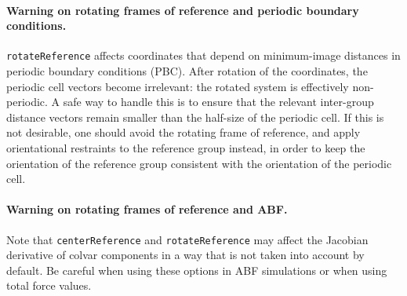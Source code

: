 \paragraph*{Warning on rotating frames of reference and periodic boundary conditions.}
\texttt{rotateReference} affects coordinates that depend on minimum-image distances in periodic boundary conditions (PBC).
After rotation of the coordinates, the periodic cell vectors become irrelevant: the rotated system is effectively non-periodic.
A safe way to handle this is to ensure that the relevant inter-group distance vectors remain smaller than the half-size of the periodic cell.
If this is not desirable, one should avoid the rotating frame of reference, and apply orientational restraints to the reference group instead, in order to keep the orientation of the reference group consistent with the orientation of the periodic cell.

\paragraph*{Warning on rotating frames of reference and ABF.}
Note that \texttt{centerReference} and \texttt{rotateReference} may affect the Jacobian derivative of colvar components in a way that is not taken into account by default.
Be careful when using these options in ABF simulations or when using total force values.

